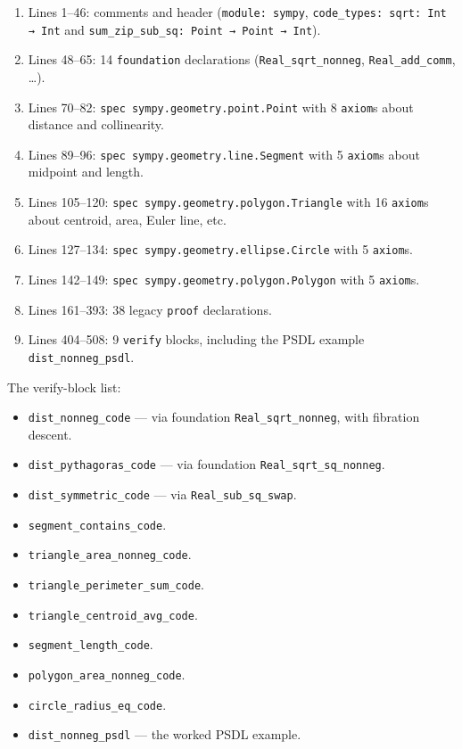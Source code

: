 \begin{enumerate}[leftmargin=1.7em]
  \item Lines 1--46: comments and header (\texttt{module: sympy},
    \texttt{code\_types: sqrt: Int → Int} and
    \texttt{sum\_zip\_sub\_sq: Point → Point → Int}).
  \item Lines 48--65: 14 \texttt{foundation} declarations
    (\texttt{Real\_sqrt\_nonneg}, \texttt{Real\_add\_comm},
    \dots).
  \item Lines 70--82: \texttt{spec sympy.geometry.point.Point} with
    8 \texttt{axiom}s about distance and collinearity.
  \item Lines 89--96: \texttt{spec sympy.geometry.line.Segment} with
    5 \texttt{axiom}s about midpoint and length.
  \item Lines 105--120: \texttt{spec sympy.geometry.polygon.Triangle}
    with 16 \texttt{axiom}s about centroid, area, Euler line, etc.
  \item Lines 127--134: \texttt{spec sympy.geometry.ellipse.Circle}
    with 5 \texttt{axiom}s.
  \item Lines 142--149: \texttt{spec sympy.geometry.polygon.Polygon}
    with 5 \texttt{axiom}s.
  \item Lines 161--393: 38 legacy \texttt{proof} declarations.
  \item Lines 404--508: 9 \texttt{verify} blocks, including the
    PSDL example \texttt{dist\_nonneg\_psdl}.
\end{enumerate}

The verify-block list:
\begin{itemize}[leftmargin=1.7em]
  \item \texttt{dist\_nonneg\_code} --- via foundation
    \texttt{Real\_sqrt\_nonneg}, with fibration descent.
  \item \texttt{dist\_pythagoras\_code} --- via foundation
    \texttt{Real\_sqrt\_sq\_nonneg}.
  \item \texttt{dist\_symmetric\_code} --- via
    \texttt{Real\_sub\_sq\_swap}.
  \item \texttt{segment\_contains\_code}.
  \item \texttt{triangle\_area\_nonneg\_code}.
  \item \texttt{triangle\_perimeter\_sum\_code}.
  \item \texttt{triangle\_centroid\_avg\_code}.
  \item \texttt{segment\_length\_code}.
  \item \texttt{polygon\_area\_nonneg\_code}.
  \item \texttt{circle\_radius\_eq\_code}.
  \item \texttt{dist\_nonneg\_psdl} --- the worked PSDL example.
\end{itemize}

